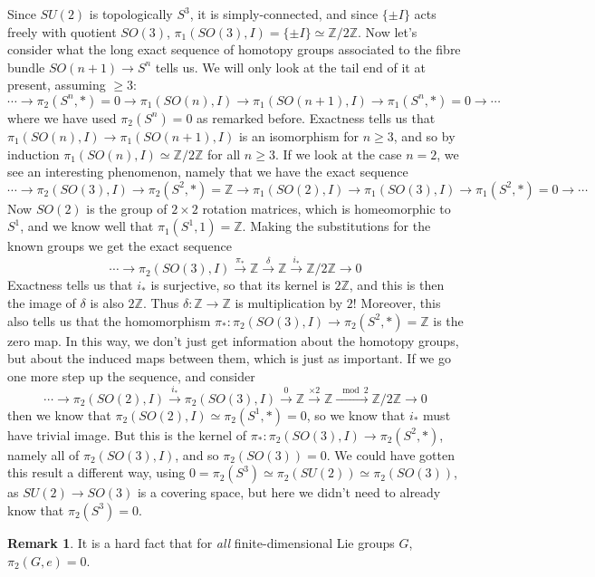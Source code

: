 \documentclass{tufte-handout}
\def\ZZ{\mathbb{Z}}
\theoremstyle{definition}
\newtheorem*{rem}{Remark}
\begin{document}
Since $SU(2)$ is topologically $S^3$, it is simply-connected, and since $\{\pm I\}$ acts freely with quotient $SO(3)$, $\pi_1(SO(3),I) = \{\pm I\} \simeq \ZZ/2\ZZ$. Now let's consider what the long exact sequence of homotopy groups associated to the fibre bundle $SO(n+1) \to S^n$ tells us. We will only look at the tail end of it at present, assuming $\geq 3$:
\[
	\cdots \to \pi_2(S^n,*) = 0 \to \pi_1(SO(n),I) \to \pi_1(SO(n+1),I) \to \pi_1(S^n,*) = 0 \to \cdots
\]
where we have used $\pi_2(S^n) = 0$ as remarked before. Exactness tells us that $\pi_1(SO(n),I) \to \pi_1(SO(n+1),I)$ is an isomorphism for $n\geq 3$, and so by induction $\pi_1(SO(n),I) \simeq \ZZ/2\ZZ$ for all $n\geq 3$. If we look at the case $n=2$, we see an interesting phenomenon, namely that we have the exact sequence
\[
	\cdots \to \pi_2(SO(3),I) \to \pi_2(S^2,*) = \ZZ \to \pi_1(SO(2),I) \to \pi_1(SO(3),I) \to \pi_1(S^2,*) = 0 \to \cdots
\]
Now $SO(2)$ is the group of $2\times 2$ rotation matrices, which is homeomorphic to $S^1$, and we know well that $\pi_1(S^1,1)=\ZZ$. Making the substitutions for the known groups we get the exact sequence
\[
	\cdots \to \pi_2(SO(3),I) \xrightarrow{\pi_*} \ZZ \xrightarrow{\delta} \ZZ \xrightarrow{i_*} \ZZ/2\ZZ \to 0 
\]
Exactness tells us that $i_*$ is surjective, so that its kernel is $2\ZZ$, and this is then the image of $\delta$ is also $2\ZZ$. Thus $\delta\colon \ZZ \to \ZZ$ is multiplication by $2$! Moreover, this also tells us that the homomorphism $\pi_*\colon \pi_2(SO(3),I) \to \pi_2(S^2,*)=\ZZ$ is the zero map. In this way, we don't just get information about the homotopy groups, but about the induced maps between them, which is just as important. If we go one more step up the sequence, and consider
\[
	\cdots \to \pi_2(SO(2),I) \xrightarrow{i_*} \pi_2(SO(3),I) \xrightarrow{0} \ZZ \xrightarrow{\times 2} \ZZ \xrightarrow{\mod 2} \ZZ/2\ZZ \to 0
\]
then we know that $\pi_2(SO(2),I) \simeq \pi_2(S^1,*) = 0$, so we know that $i_*$ must have trivial image. But this is the kernel of $\pi_*\colon \pi_2(SO(3),I) \to \pi_2(S^2,*)$, namely all of $\pi_2(SO(3),I)$, and so $\pi_2(SO(3)) = 0$. We could have gotten this result a different way, using $0=\pi_2(S^3)\simeq\pi_2(SU(2)) \simeq \pi_2(SO(3))$, as $SU(2) \to SO(3)$ is a covering space, but here we didn't need to already know that $\pi_2(S^3)=0$.

\begin{rem}
It is a hard fact that for \emph{all} finite-dimensional Lie groups $G$, $\pi_2(G,e) = 0$.
\end{rem}
\end{document}
